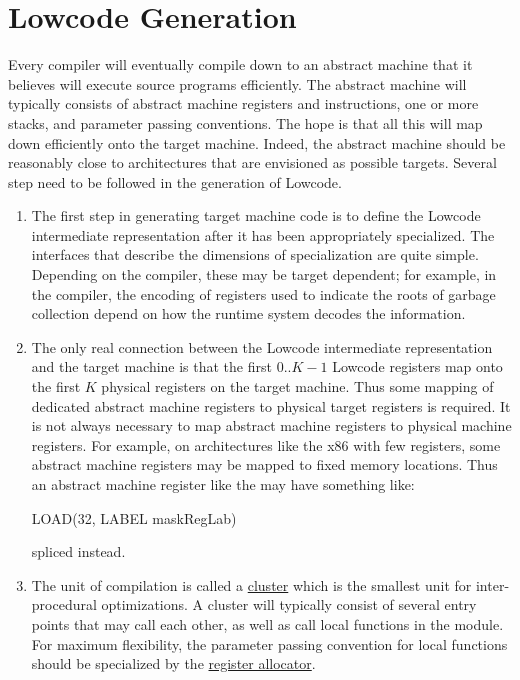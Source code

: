 \section{Lowcode Generation}
  Every compiler will eventually compile down to an abstract machine
  that it believes will execute source programs efficiently. The
  abstract machine will typically consists of abstract machine
  registers and instructions, one or more stacks, and parameter
  passing conventions.  The hope is that all this will map down
  efficiently onto the target machine. Indeed, the abstract machine
  should be reasonably close to architectures that are envisioned as
  possible targets. Several step need to be followed in the generation
  of Lowcode.

  \begin{enumerate}
   \item The first step in generating target machine code is to define
   the Lowcode intermediate representation after it has been
   appropriately specialized. The interfaces that describe the
   dimensions of specialization are quite simple. Depending on the
   compiler, these may be target dependent; for example, in the
   compiler, the encoding of registers used to indicate the roots of
   garbage collection depend on how the runtime system decodes the
   information.

  \item The only real connection between the Lowcode intermediate
  representation and the target machine is that the first
  $0..K-1$ Lowcode registers map onto the first $K$
  physical registers on the target machine. Thus some mapping of
  dedicated abstract machine registers to physical target registers is
  required. It is not always necessary to map abstract machine
  registers to physical machine registers. For example, on
  architectures like the x86 with few registers, some abstract machine
  registers may be mapped to fixed memory locations. Thus an abstract
  machine register like the  may have something like:
\begin{SML}
  LOAD(32, LABEL maskRegLab) 
\end{SML}
spliced instead.

  \item The unit of compilation is called a 
   \href{cluster.html}{cluster} which
  is the smallest unit for inter-procedural optimizations. A cluster
  will typically consist of several entry points that may call each
  other, as well as call local functions in the module. For maximum
  flexibility, the parameter passing convention for local functions
  should be specialized by the \href{lowcode-ra.html}{register allocator}.


\end{enumerate}
